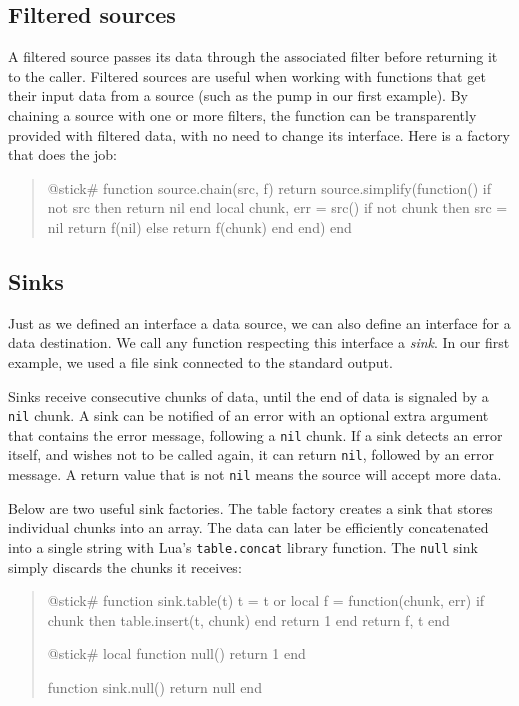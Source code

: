 \documentclass[10pt]{article}
\begin{document}
\subsection{Filtered sources}

A filtered source passes its data through the
associated filter before returning it to the caller. 
Filtered sources are useful when working with
functions that get their input data from a source (such as
the pump in our first example). By chaining a source with one or
more filters, the function can be transparently provided
with filtered data, with no need to change its interface. 
Here is a factory that does the job:
\begin{quote}
\begin{lua}
@stick#
function source.chain(src, f)
  return source.simplify(function()
    if not src then return nil end
    local chunk, err = src()
    if not chunk then 
      src = nil
      return f(nil)
    else return f(chunk) end
  end)
end
%
\end{lua}
\end{quote}

\subsection{Sinks}

Just as we defined an interface a data source, 
we can also define an interface for a data destination. 
We call any function respecting this
interface a \emph{sink}. In our first example, we used a
file sink connected to the standard output. 

Sinks receive consecutive chunks of data, until the end of
data is signaled by a \texttt{nil} chunk. A sink can be
notified of an error with an optional extra argument that
contains the error message, following a \texttt{nil} chunk.  
If a sink detects an error itself, and
wishes not to be called again, it can return \texttt{nil},
followed by an error message. A return value that
is not \texttt{nil} means the source will accept more data.

Below are two useful sink factories. 
The table factory creates a sink that stores
individual chunks into an array. The data can later be
efficiently concatenated into a single string with Lua's
\texttt{table.concat} library function. The \texttt{null} sink 
simply discards the chunks it receives:
\begin{quote}
\begin{lua}
@stick#
function sink.table(t)
  t = t or {}
  local f = function(chunk, err)
    if chunk then table.insert(t, chunk) end
    return 1
  end
  return f, t
end
%

@stick#
local function null()
  return 1
end

function sink.null()
  return null
end
%
\end{lua}
\end{quote}
\end{document}
